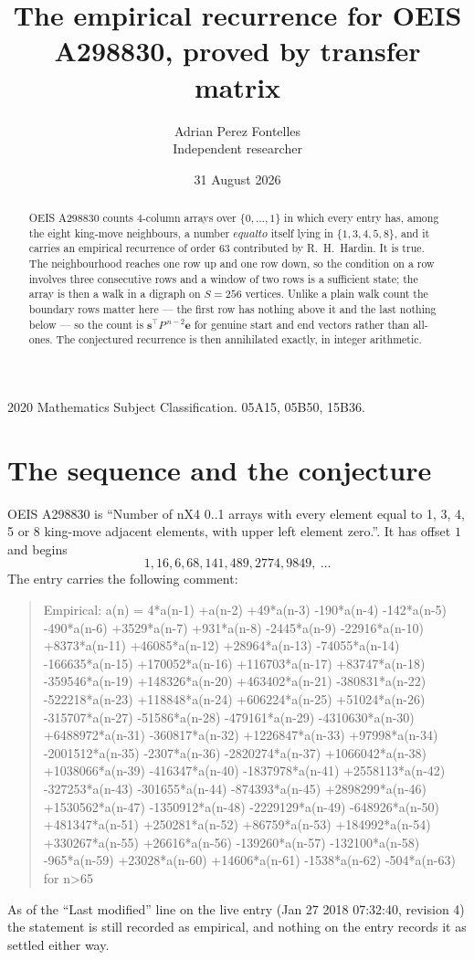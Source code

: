 \documentclass[11pt,a4paper]{article}
\title{The empirical recurrence for OEIS A298830, proved by transfer matrix}
\author{Adrian Perez Fontelles\\ \small Independent researcher}
\date{31 August 2026}
\theoremstyle{plain}
\theoremstyle{definition}
\begin{document}
\maketitle

\begin{abstract}
OEIS A298830 counts $4$-column arrays over $\{0,\dots,1\}$ in which every entry has,
among the eight king-move neighbours, a number $equal to$ itself lying in $\{1,3,4,5,8\}$, and it carries an empirical
recurrence of order $63$ contributed by R.~H.~Hardin. It is true. The neighbourhood
reaches one row up and one row down, so the condition on a row involves three consecutive
rows and a window of two rows is a sufficient state; the array is then a walk in a digraph
on $S=256$ vertices. Unlike a plain walk count the boundary rows matter here --- the first
row has nothing above it and the last nothing below --- so the count is
$\mathbf{s}^{\!\top}P^{\,n-2}\mathbf{e}$ for genuine start and end vectors rather than
all-ones. The conjectured recurrence is then annihilated exactly, in integer arithmetic.
\end{abstract}

\noindent\small 2020 Mathematics Subject Classification. 05A15, 05B50, 15B36.\normalsize

\section{The sequence and the conjecture}

OEIS A298830 is ``Number of nX4 0..1 arrays with every element equal to 1, 3, 4, 5 or 8 king-move adjacent elements, with upper left element zero.''. It has offset
$1$ and begins
\[
1, 16, 6, 68, 141, 489, 2774, 9849,\ \dots
\]
The entry carries the following comment:
\begin{quote}\small
Empirical: a(n) = 4*a(n-1) +a(n-2) +49*a(n-3) -190*a(n-4) -142*a(n-5) -490*a(n-6) +3529*a(n-7) +931*a(n-8) -2445*a(n-9) -22916*a(n-10) +8373*a(n-11) +46085*a(n-12) +28964*a(n-13) -74055*a(n-14) -166635*a(n-15) +170052*a(n-16) +116703*a(n-17) +83747*a(n-18) -359546*a(n-19) +148326*a(n-20) +463402*a(n-21) -380831*a(n-22) -522218*a(n-23) +118848*a(n-24) +606224*a(n-25) +51024*a(n-26) -315707*a(n-27) -51586*a(n-28) -479161*a(n-29) -4310630*a(n-30) +6488972*a(n-31) -360817*a(n-32) +1226847*a(n-33) +97998*a(n-34) -2001512*a(n-35) -2307*a(n-36) -2820274*a(n-37) +1066042*a(n-38) +1038066*a(n-39) -416347*a(n-40) -1837978*a(n-41) +2558113*a(n-42) -327253*a(n-43) -301655*a(n-44) -874393*a(n-45) +2898299*a(n-46) +1530562*a(n-47) -1350912*a(n-48) -2229129*a(n-49) -648926*a(n-50) +481347*a(n-51) +250281*a(n-52) +86759*a(n-53) +184992*a(n-54) +330267*a(n-55) +26616*a(n-56) -139260*a(n-57) -132100*a(n-58) -965*a(n-59) +23028*a(n-60) +14606*a(n-61) -1538*a(n-62) -504*a(n-63) for n>65
\end{quote}
As of the ``Last modified'' line on the live entry (Jan 27 2018 07:32:40, revision
4) the statement is still recorded as empirical, and nothing on the entry
records it as settled either way.
\end{document}
